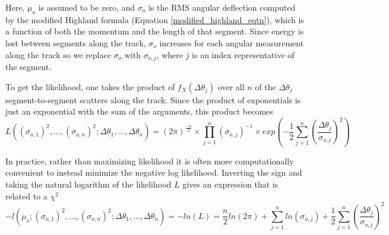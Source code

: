 \documentclass[a4paper,11pt]{article}
\begin{document}
Here, $\mu_o$ is assumed to be zero, and $\sigma_o$ is the RMS angular deflection computed by the modified Highland formula (Equation \ref{modified_highland_eqtn}), which is a function of both the momentum and the length of that segment. Since energy is lost between segments along the track, $\sigma_o$ increases for each angular measurement along the track so we replace $\sigma_o$ with $\sigma_{o,j}$, where $j$ is an index representative of the segment. \newline

To get the likelihood, one takes the product of $f_X(\Delta\theta_j)$ over all $n$ of the $\Delta\theta_j$ segment-to-segment scatters along the track. Since the product of exponentials is just an exponential with the sum of the arguments, this product becomes
\begin{equation}
L((\sigma_{o,1})^2,...,(\sigma_{o,n})^2;\Delta\theta_1,...,\Delta\theta_n) = (2\pi)^\frac{-n}{2}\times\prod_{j=1}^{n}(\sigma_{o,j})^{-1} \times exp(-\frac{1}{2}\sum_{j=1}^{n}(\frac{\Delta\theta_j}{\sigma_{o,j}})^2)
\end{equation}

In practice, rather than maximizing likelihood it is often more computationally convenient to instead minimize the negative log likelihood. Inverting the sign and taking the natural logarithm of the likelihood $L$ gives an expression that is related to a $\chi^2$
\begin{equation}\label{leo_llhd_eqtn}
-l(\mu_o;(\sigma_{o,1})^2,...,(\sigma_{o,n})^2;\Delta\theta_1,...,\Delta\theta_n) = -ln(L) = \frac{n}{2}ln(2\pi) + \sum_{j=1}^{n}ln(\sigma_{o,j}) + \frac{1}{2}\sum_{j=1}^{n}(\frac{\Delta\theta_j}{\sigma_{o,j}})^2
\end{equation}


\end{document}
